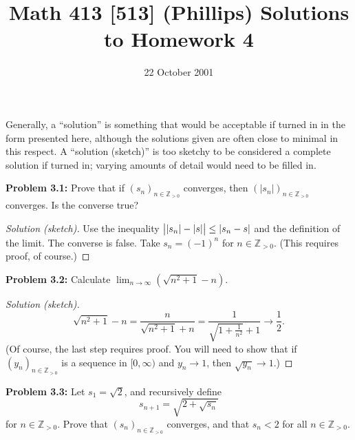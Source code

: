 \documentclass[10pt]{amsart}
\title{Math 413 [513] (Phillips) Solutions to Homework 4}
\date{22 October 2001}
\newcommand{\I}{\infty}
\newcommand{\N}{{\mathbb{Z}}_{> 0}}
\begin{document}

\maketitle

Generally, a ``solution'' is something that would be acceptable
if turned in in the form presented here, although the solutions
given are often close to minimal in this respect.
A ``solution (sketch)'' is too sketchy to be considered a
complete solution if turned in;
varying amounts of detail would need to be filled in.

\vspace{3ex}

\noindent
{\textbf{Problem 3.1:}}
Prove that if $(s_n)_{n \in \N}$ converges,
then $( |s_n| )_{n \in \N}$ converges.
Is the converse true?

\vspace{1ex}

\begin{proof}[Solution (sketch)]
Use the inequality
$\left| \rule{0em}{2ex} |s_n| - |s| \right| \le |s_n - s|$ and
the definition of the limit.
The converse is false.
Take $s_n = (-1)^n$ for $n \in \N$.
(This requires proof, of course.)
\end{proof}

\vspace{2ex}

\noindent
{\textbf{Problem 3.2:}}
Calculate $\lim_{n \to \I} \left( \sqrt{n^2+1} - n \right)$.

\vspace{1ex}

\begin{proof}[Solution (sketch)]
\[
\sqrt{n^2 + 1} - n = \frac{n}{\sqrt{n^2 + 1} + n}
    = \frac{1}{\sqrt{1 + \frac{1}{n^2} } + 1} \to \frac{1}{2}.
\]
(Of course, the last step requires proof.
You will need to show that if $(y_n)_{n \in \N}$
is a sequence in $[0, \I)$
and $y_n \to 1$,
then $\sqrt{y_n} \to 1$.)
\end{proof}

\vspace{2ex}

\noindent
{\textbf{Problem 3.3:}}
Let $s_1 = \sqrt{2}$, and recursively define
\[
s_{n + 1} = \sqrt{2 + \sqrt{s_n}}
\]
for $n \in \N$.
Prove that $(s_n)_{n \in \N}$ converges,
and that $s_n < 2$ for all $n \in \N$.

\vspace{1ex}
\end{document}
